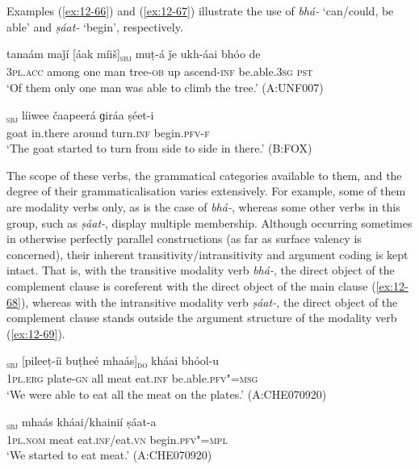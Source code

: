 Examples (\ref{ex:12-66}) and (\ref{ex:12-67}) illustrate the use of \textit{bhá-} `can/could, be able' and \textit{ṣáat-} `begin', respectively.
\begin{exe}
\ex
\label{ex:12-66}
\gll tanaám maǰí [áak míiš]\textsubscript{\textsc{sbj}} muṭ-á ǰe ukh-áai bhóo de \\
\textsc{3pl.acc} among one man tree-\textsc{ob} up ascend-\textsc{inf}  be.able.\textsc{3sg} \textsc{pst} \\
\glt `Of them only one man was able to climb the tree.' (A:UNF007)
\end{exe}
\begin{exe}
\ex
\label{ex:12-67}
\gll [čhéeli]\textsubscript{\textsc{sbj}} líiwee čaapeerá ɡiráa ṣéet-i \\
goat in.there around turn.\textsc{inf} begin.\textsc{pfv-f} \\
\glt `The goat started to turn from side to side in there.' (B:FOX)
\end{exe}

The scope of these verbs, the grammatical categories available to them, and the degree of their grammaticalisation varies extensively. For example, some of them are modality verbs only, as is the case of \textit{bhá-}, whereas some other verbs in this group, such as \textit{ṣáat-}, display multiple membership. Although occurring sometimes in otherwise perfectly parallel constructions (as far as surface valency is concerned), their inherent transitivity/intransitivity and argument coding is kept intact. That is, with the transitive modality verb \textit{bhá-}, the direct object of the complement clause is coreferent with the direct object of the main clause (\ref{ex:12-68}), whereas with the intransitive modality verb \textit{ṣáat-,} the direct object of the complement clause stands outside the argument structure of the modality verb (\ref{ex:12-69}).

\begin{exe}
\ex
\label{ex:12-68}
\gll [asím]\textsubscript{\textsc{sbj}} [pileeṭ-íi buṭheé mhaás]\textsubscript{\textsc{do}} kháai bhóol-u \\
\textsc{1pl.erg} plate-\textsc{gn} all meat eat.\textsc{inf} be.able.\textsc{pfv"=msg} \\
\glt `We were able to eat all the meat on the plates.' (A:CHE070920)
\end{exe}
\begin{exe}
\ex
\label{ex:12-69}
\gll [be]\textsubscript{\textsc{sbj}} mhaás kháai/khainií ṣáat-a \\
\textsc{1pl.nom} meat eat.\textsc{inf}/eat.\textsc{vn} begin.\textsc{pfv"=mpl} \\
\glt `We started to eat meat.' (A:CHE070920)
\end{exe}

